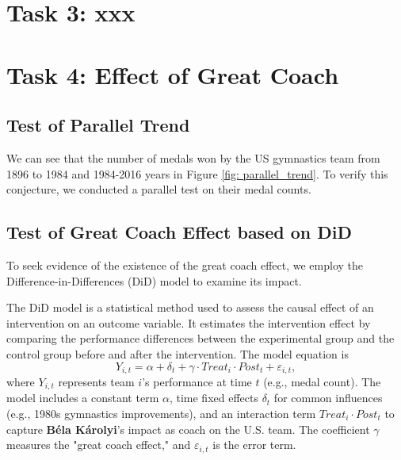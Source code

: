 \documentclass{mcmthesis}
\begin{document}
	
	
	
	
	
	
	
	
	
	
	
	
	
	
	
	
	
	
	
	
	\section{Task 3: xxx}
	
	
	\section{Task 4: Effect of Great Coach}
	

	
\subsection{Test of Parallel Trend }

We can see that the number of medals won by the US gymnastics team from 1896 to 1984 and 1984-2016 years in Figure \ref{fig: parallel_trend}. To verify this conjecture, we conducted a parallel test on their medal counts.


\subsection{Test of Great Coach Effect based on DiD}

To seek evidence of the existence of the great coach effect, we employ the Difference-in-Differences (DiD) model to examine its impact.

The DiD model is a statistical method used to assess the causal effect of an intervention on an outcome variable. It estimates the intervention effect by comparing the performance differences between the experimental group and the control group before and after the intervention. The model equation is 
\begin{equation}
Y_{i,t}=\alpha+\delta_t+\gamma \cdot Treat_i \cdot Post_t + \varepsilon_{i,t},
\end{equation}
where \( Y_{i,t} \) represents team \( i \)'s performance at time \( t \) (e.g., medal count). The model includes a constant term \(\alpha\), time fixed effects \(\delta_t\) for common influences (e.g., 1980s gymnastics improvements), and an interaction term \( Treat_i \cdot Post_t \) to capture \textbf{Béla Károlyi}'s impact as coach on the U.S. team. The coefficient \(\gamma\) measures the "great coach effect," and \(\varepsilon_{i,t}\) is the error term.
\end{document}
